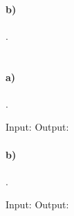 \documentclass[11pt,letterpaper]{article}
\begin{document}
		\paragraph{b)}
		.
		
	\section{}
	
		\paragraph{a)}
		.
		\begin{algorithm}[caption={f()}, label={alg4}]
Input: 
Output: 


		\end{algorithm}
		
		\paragraph{b)}
		.
		
		\begin{algorithm}[caption={f()}, label={alg5}]
Input: 
Output: 


		\end{algorithm}
		
\end{document}
